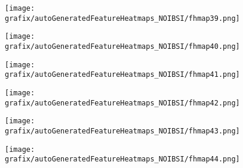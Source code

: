 \hspace{\hsp} 
\begin{subfigure}{\wid\textwidth} 
    \centering 
    \caption{\tiny \sffamily {}} 
    \vspace{\vsp} 
    \texttt{[image: grafix/autoGeneratedFeatureHeatmaps\_NOIBSI/fhmap39.png]} 
\end{subfigure} 
\hspace{\hsp} 
\begin{subfigure}{\wid\textwidth} 
    \centering 
    \caption{\tiny \sffamily {}} 
    \vspace{\vsp} 
    \texttt{[image: grafix/autoGeneratedFeatureHeatmaps\_NOIBSI/fhmap40.png]} 
\end{subfigure} 
\hspace{\hsp} 
\begin{subfigure}{\wid\textwidth} 
    \centering 
    \caption{\tiny \sffamily {}} 
    \vspace{\vsp} 
    \texttt{[image: grafix/autoGeneratedFeatureHeatmaps\_NOIBSI/fhmap41.png]} 
\end{subfigure} 
\hspace{\hsp} 
\begin{subfigure}{\wid\textwidth} 
    \centering 
    \caption{\tiny \sffamily {}} 
    \vspace{\vsp} 
    \texttt{[image: grafix/autoGeneratedFeatureHeatmaps\_NOIBSI/fhmap42.png]} 
\end{subfigure} 
\hspace{\hsp} 
\begin{subfigure}{\wid\textwidth} 
    \centering 
    \caption{\tiny \sffamily {}} 
    \vspace{\vsp} 
    \texttt{[image: grafix/autoGeneratedFeatureHeatmaps\_NOIBSI/fhmap43.png]} 
\end{subfigure} 
\hspace{\hsp} 
\begin{subfigure}{\wid\textwidth} 
    \centering 
    \caption{\tiny \sffamily {}} 
    \vspace{\vsp} 
    \texttt{[image: grafix/autoGeneratedFeatureHeatmaps\_NOIBSI/fhmap44.png]} 
\end{subfigure} 
\hspace{\hsp} 
